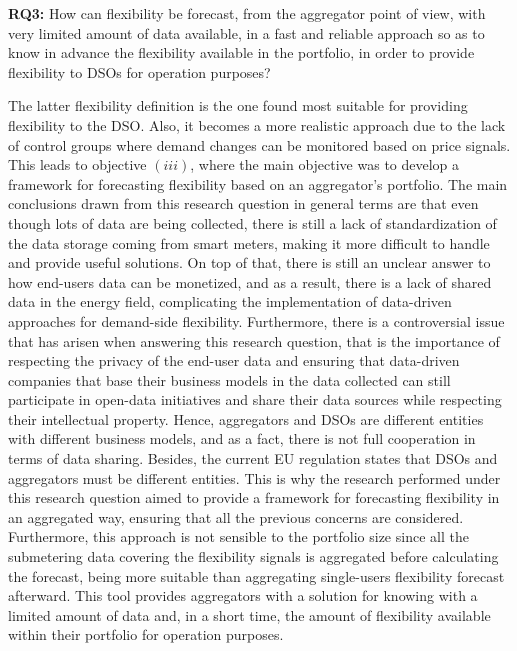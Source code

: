 \begin{tcolorbox}
\textbf{RQ3:} How can flexibility be forecast, from the aggregator point of view, with very limited amount of data available, in a fast and reliable approach so as to know in advance the flexibility available in the portfolio, in order to provide flexibility to DSOs for operation purposes?
\end{tcolorbox}

The latter flexibility definition is the one found most suitable for providing flexibility to the DSO. Also, it becomes a more realistic approach due to the lack of control groups where demand changes can be monitored based on price signals. This leads to objective $(iii)$, where the main objective was to develop a framework for forecasting flexibility based on an aggregator's portfolio. The main conclusions drawn from this research question in general terms are that even though lots of data are being collected, there is still a lack of standardization of the data storage coming from smart meters, making it more difficult to handle and provide useful solutions. On top of that, there is still an unclear answer to how end-users data can be monetized, and as a result, there is a lack of shared data in the energy field, complicating the implementation of data-driven approaches for demand-side flexibility. Furthermore, there is a controversial issue that has arisen when answering this research question, that is the importance of respecting the privacy of the end-user data and ensuring that data-driven companies that base their business models in the data collected can still participate in open-data initiatives and share their data sources while respecting their intellectual property. Hence, aggregators and DSOs are different entities with different business models, and as a fact, there is not full cooperation in terms of data sharing. Besides, the current EU regulation states that DSOs and aggregators must be different entities. This is why the research performed under this research question aimed to provide a framework for forecasting flexibility in an aggregated way, ensuring that all the previous concerns are considered. Furthermore, this approach is not sensible to the portfolio size since all the submetering data covering the flexibility signals is aggregated before calculating the forecast, being more suitable than aggregating single-users flexibility forecast afterward. This tool provides aggregators with a solution for knowing with a limited amount of data and, in a short time, the amount of flexibility available within their portfolio for operation purposes. 

